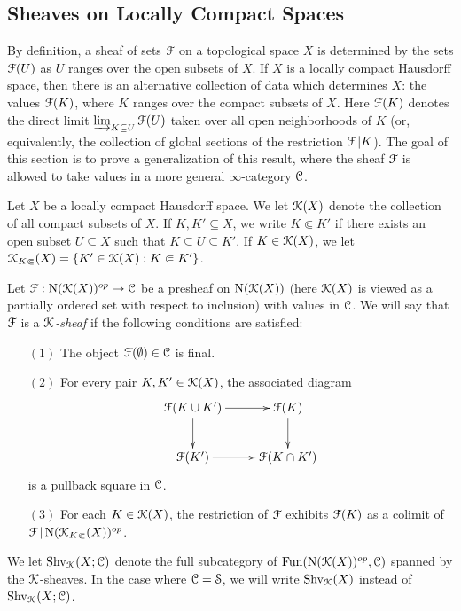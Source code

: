\subsection{Sheaves on Locally Compact Spaces}\label{properproper}

By definition, a sheaf of sets $\operatorname{\mathcal{F}}$ on a topological space $X$ is determined by the sets
$\operatorname{\mathcal{F}}(U)$ as $U$ ranges over the open subsets of $X$. If $X$ is a locally compact Hausdorff space, then there is an alternative collection of data which determines $X$: the values
$\operatorname{\mathcal{F}}(K)$, where $K$ ranges over the compact subsets of $X$. Here $\operatorname{\mathcal{F}}(K)$ denotes the direct limit $\operatorname{\varinjlim}_{K \subseteq U} \operatorname{\mathcal{F}}(U)$ taken over all open neighborhoods of $K$ (or, equivalently, the collection of global sections of the restriction $\operatorname{\mathcal{F}}|K$). The goal of this section is to prove a generalization of this result, where the sheaf $\operatorname{\mathcal{F}}$ is allowed to take values in a more general $\infty$-category $\operatorname{\mathcal{C}}$.

\begin{definition}
Let $X$ be a locally compact Hausdorff space. We let $\operatorname{\mathcal{K}}(X)$ denote the collection of all compact subsets of $X$.
If $K, K' \subseteq X$, we write $K \Subset K'$ if there exists an open subset $U \subseteq X$ such that $K \subseteq U \subseteq K'$. If $K \in \operatorname{\mathcal{K}}(X)$, we let $\operatorname{\mathcal{K}}_{K \Subset}(X) = \{ K' \in \operatorname{\mathcal{K}}(X): K \Subset K' \}$.

Let $\operatorname{\mathcal{F}}: \operatorname{N}(\operatorname{\mathcal{K}}(X))^{op} \rightarrow \operatorname{\mathcal{C}}$ be a presheaf on $\operatorname{N}(\operatorname{\mathcal{K}}(X))$ (here $\operatorname{\mathcal{K}}(X)$ is viewed as a partially ordered set with respect to inclusion) with values in $\operatorname{\mathcal{C}}$.
We will say that
$\operatorname{\mathcal{F}}$ is a {\it $\operatorname{\mathcal{K}}$-sheaf} if the following conditions are satisfied:
\begin{itemize}
\item[$(1)$] The object $\operatorname{\mathcal{F}}(\emptyset) \in \operatorname{\mathcal{C}}$ is final.
\item[$(2)$] For every pair $K, K' \in \operatorname{\mathcal{K}}(X)$, the associated diagram
$$ \xymatrix{ \calF( K \cup K' ) \ar[r] \ar[d] & \calF(K) \ar[d] \\
\calF(K') \ar[r] & \calF(K \cap K') }$$
is a pullback square in $\operatorname{\mathcal{C}}$.
\item[$(3)$] For each $K \in \operatorname{\mathcal{K}}(X)$, the restriction of $\operatorname{\mathcal{F}}$ exhibits
$\operatorname{\mathcal{F}}(K)$ as a colimit of $\operatorname{\mathcal{F}} | \operatorname{N}(\operatorname{\mathcal{K}}_{K \Subset}(X))^{op}$.
\end{itemize}

We let $\operatorname{Shv}_{\operatorname{\mathcal{K}}}(X;\operatorname{\mathcal{C}})$ denote the full subcategory of $\operatorname{Fun}(\operatorname{N}(\operatorname{\mathcal{K}}(X))^{op},\operatorname{\mathcal{C}})$ spanned by the $\operatorname{\mathcal{K}}$-sheaves. In the case where $\operatorname{\mathcal{C}} = \operatorname{\mathcal{S}}$, we will write
$\operatorname{Shv}_{\operatorname{\mathcal{K}}}(X)$ instead of $\operatorname{Shv}_{\operatorname{\mathcal{K}}}(X;\operatorname{\mathcal{C}})$.
\end{definition}

